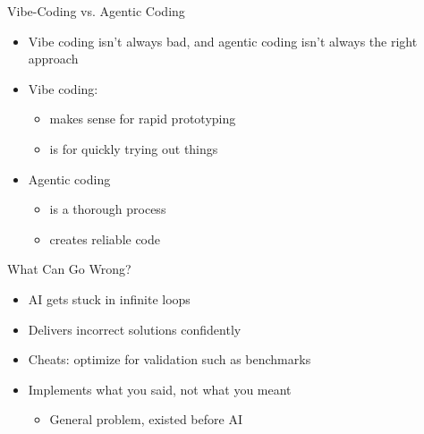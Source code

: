 \documentclass[
ps,
]{prosper}
\begin{document}
\begin{slide}{Vibe-Coding vs. Agentic Coding}

\begin{itemize}

\item Vibe coding isn't always bad, and agentic coding isn't always the right approach

\item Vibe coding:

  \begin{itemize}
    
  \item makes sense for rapid prototyping
    
  \item is for quickly trying out things
    
  \end{itemize}
    
\item Agentic coding

  \begin{itemize}
    
  \item is a thorough process
    
  \item creates reliable code
    
  \end{itemize}

\end{itemize}
  
\end{slide}



\begin{slide}{What Can Go Wrong?}

\begin{itemize}

\item AI gets stuck in infinite loops

\item Delivers incorrect solutions confidently

\item Cheats: optimize for validation such as benchmarks
  
\item Implements what you said, not what you meant

\begin{itemize}

\item General problem, existed before AI

\end{itemize}
  
\end{itemize}
  
\end{slide}
\end{document}
